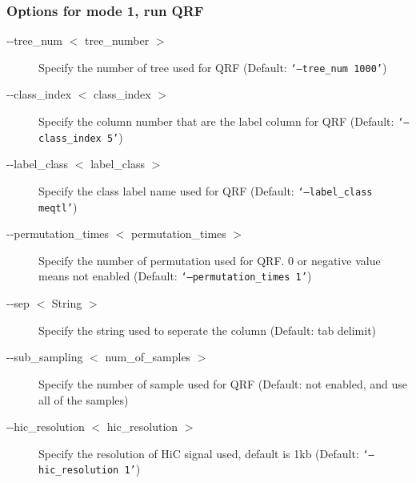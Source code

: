 \documentclass[12pt]{article}
\begin{document}
{\color{blue}\subsubsection{Options for mode 1, run QRF}}
\begin{description}

\item[-{}-tree\_num \begin{math}<\end{math} tree\_number \begin{math}>\end{math}]  Specify the number of tree used for QRF (Default: {\tt `--tree\_num 1000'})
\item[-{}-class\_index \begin{math}<\end{math} class\_index \begin{math}>\end{math}]  Specify the column number that are the label column for QRF (Default: {\tt `--class\_index 5'})
\item[-{}-label\_class \begin{math}<\end{math} label\_class \begin{math}>\end{math}]  Specify the class label name used for QRF (Default: {\tt `--label\_class meqtl'})
\item[-{}-permutation\_times \begin{math}<\end{math} permutation\_times \begin{math}>\end{math}]  Specify the number of permutation used for QRF. 0 or negative value means not enabled (Default: {\tt `--permutation\_times 1'})
\item[-{}-sep \begin{math}<\end{math} String \begin{math}>\end{math}]  Specify the string used to seperate the column (Default: tab delimit)
\item[-{}-sub\_sampling \begin{math}<\end{math} num\_of\_samples \begin{math}>\end{math}]  Specify the number of sample used for QRF (Default: not enabled, and use all of the samples)
\item[-{}-hic\_resolution \begin{math}<\end{math} hic\_resolution \begin{math}>\end{math}]  Specify the resolution of HiC signal used, default is 1kb (Default: {\tt `--hic\_resolution 1'})

\end{description}
\end{document}
